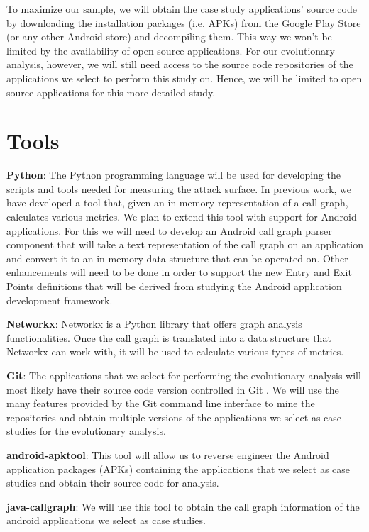 \documentclass[conference]{IEEEtran}
\begin{document}
To maximize our sample, we will obtain the case study applications' source code by downloading the installation packages (i.e. APKs) from the Google Play Store (or any other Android store) and decompiling them. This way we won't be limited by the availability of open source applications. For our evolutionary analysis, however, we will still need access to the source code repositories of the applications we select to perform this study on. Hence, we will be limited to open source applications for this more detailed study.

\section{Tools}

\textbf{Python}: The Python \cite{python_lang} programming language will be used for developing the scripts and tools needed for measuring the attack surface. In previous work, we have developed a tool that, given an in-memory representation of a call graph, calculates various metrics. We plan to extend this tool with support for Android applications. For this we will need to develop an Android call graph parser component that will take a text representation of the call graph on an application and convert it to an in-memory data structure that can be operated on. Other enhancements will need to be done in order to support the new Entry and Exit Points definitions that will be derived from studying the Android application development framework.

\textbf{Networkx}: Networkx \cite{networkx_lib} is a Python library that offers graph analysis functionalities. Once the call graph is translated into a data structure that Networkx can work with, it will be used to calculate various types of metrics.

\textbf{Git}: The applications that we select for performing the evolutionary analysis will most likely have their source code version controlled in Git \cite{git_scm}. We will use the many features provided by the Git command line interface to mine the repositories and obtain multiple versions of the applications we select as case studies for the evolutionary analysis.

\textbf{android-apktool}: This tool \cite{android_apktool} will allow us to reverse engineer the Android application packages (APKs) containing the applications that we select as case studies and obtain their source code for analysis.

\textbf{java-callgraph}: We will use this tool \cite{java_callgraph} to obtain the call graph information of the android applications we select as case studies.
\end{document}
